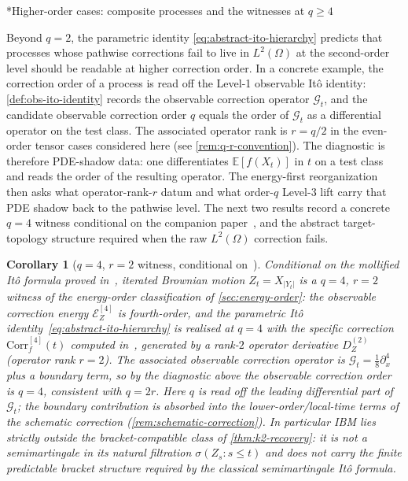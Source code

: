 \documentclass[11pt,reqno]{amsart}
\makeatletter
\renewcommand\subsection{\@startsection{subsection}{2}%
  \z@{.7\linespacing}{.5\linespacing}%
  {\normalfont\centering\scshape}}
\theoremstyle{plain}
\newtheorem{corollary}[theorem]{Corollary}
\theoremstyle{definition}
\theoremstyle{remark}
\newcommand{\E}{\mathbb{E}}
\newcommand{\Energy}{\mathcal{E}}
\newcommand{\IBM}{Z}
\makeatother
\begin{document}
\subsection*{Higher-order cases: composite processes and the
witnesses at \texorpdfstring{$q\ge 4$}{q>=4}}

Beyond $q=2$, the parametric identity
\eqref{eq:abstract-ito-hierarchy} predicts that processes whose
pathwise corrections fail to live in $L^{2}(\Omega)$ at the
second-order level should be readable at higher correction order. In
a concrete example, the correction order of a process is read off the
Level-1 observable It\^o identity: \cref{def:obs-ito-identity}
records the observable correction operator $\mathcal G_t$, and the
candidate observable correction order $q$ equals the order of
$\mathcal G_t$ as a differential operator on the test class. The
associated operator rank is $r=q/2$ in the even-order tensor cases
considered here (see \cref{rem:q-r-convention}). The diagnostic is
therefore PDE-shadow data: one differentiates $\E[f(X_t)]$ in $t$ on a
test class and reads the order of the resulting operator. The
energy-first reorganization then asks what operator-rank-$r$ datum and
what order-$q$ Level-3 lift carry that PDE shadow back to the pathwise
level. The next two results record a concrete $q=4$ witness conditional
on the companion paper~\cite{IBMPaper}, and the abstract
target-topology structure required when the raw $L^{2}(\Omega)$
correction fails.

\begin{corollary}[$q=4$, $r=2$ witness, conditional
on~\cite{IBMPaper}]\label{cor:k4-witness}
Conditional on the mollified It\^o formula proved
in~\cite[Theorem~7.1]{IBMPaper}, iterated Brownian motion
$\IBM_t=X_{|Y_t|}$ is a $q=4$, $r=2$ witness of the energy-order
classification of \cref{sec:energy-order}: the observable correction
energy $\Energy_\IBM^{[4]}$ is fourth-order, and the parametric It\^o
identity~\eqref{eq:abstract-ito-hierarchy} is realised at $q=4$ with
the specific correction $\mathrm{Corr}_f^{[4]}(t)$ computed
in~\cite[Theorem~7.1]{IBMPaper}, generated by a rank-$2$ operator
derivative $D_\IBM^{(2)}$ (operator rank $r=2$). The associated
observable correction operator is $\mathcal G_t=\tfrac18\partial_x^{4}$
plus a boundary term, so by the diagnostic above the observable
correction order is $q=4$, consistent with $q=2r$. Here $q$ is read
off the leading differential part of $\mathcal G_t$; the boundary
contribution is absorbed into the lower-order/local-time terms of the
schematic correction (\cref{rem:schematic-correction}). In particular IBM
lies strictly outside the bracket-compatible class of
\cref{thm:k2-recovery}: it is not a semimartingale in its natural
filtration $\sigma(\IBM_s:s\le t)$ and does not carry the finite
predictable bracket structure required by the classical semimartingale
It\^o formula.
\end{corollary}
\end{document}
